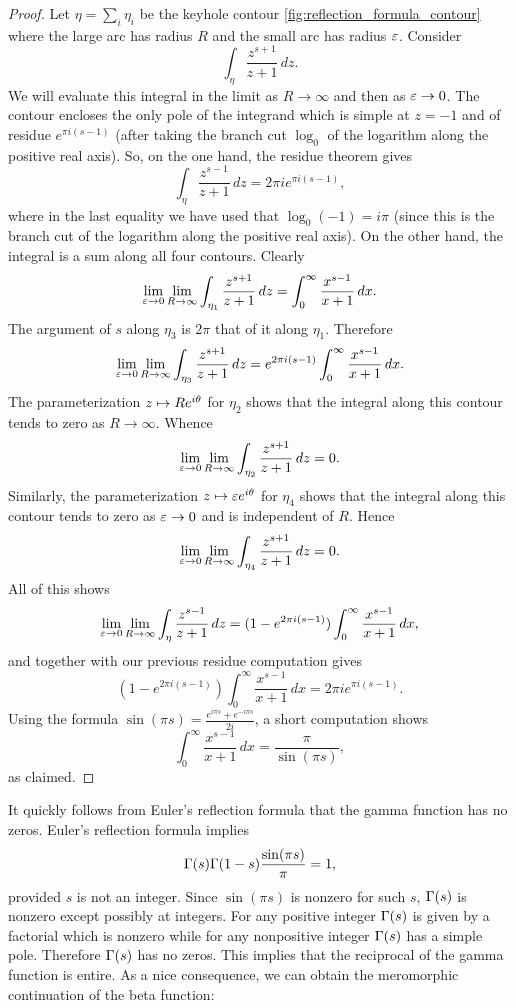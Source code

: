 \documentclass[12pt]{article}
\begin{document}
\begin{proof}
      Let \(\eta = \sum_{i}\eta_{i}\) be the keyhole contour \cref{fig:reflection_formula_contour} where the large arc has radius \(R\) and the small arc has radius \(\varepsilon\). Consider
      \[
        \int_{\eta}\frac{z^{s+1}}{z+1}\,dz.
      \]
      We will evaluate this integral in the limit as \(R \to \infty\) and then as \(\varepsilon \to 0\). The contour encloses the only pole of the integrand which is simple at \(z = -1\) and of residue \(e^{\pi i(s-1)}\) (after taking the branch cut \(\log_{0}\) of the logarithm along the positive real axis). So, on the one hand, the residue theorem gives
      \[
        \int_{\eta}\frac{z^{s-1}}{z+1}\,dz = 2\pi ie^{\pi i(s-1)},
      \]
      where in the last equality we have used that \(\log_{0}(-1) = i\pi\) (since this is the branch cut of the logarithm along the positive real axis). On the other hand, the integral is a sum along all four contours. Clearly
      \[
        \lim_{\varepsilon \to 0}\lim_{R \to \infty}\int_{\eta_{1}}\frac{z^{s+1}}{z+1}\,dz = \int_{0}^{\infty}\frac{x^{s-1}}{x+1}\,dx.
      \]
      The argument of \(s\) along \(\eta_{3}\) is \(2\pi\) that of it along \(\eta_{1}\). Therefore
      \[
        \lim_{\varepsilon \to 0}\lim_{R \to \infty}\int_{\eta_{3}}\frac{z^{s+1}}{z+1}\,dz = e^{2\pi i(s-1)}\int_{0}^{\infty}\frac{x^{s-1}}{x+1}\,dx.
      \]
      The parameterization \(z \mapsto Re^{i\theta}\) for \(\eta_{2}\) shows that the integral along this contour tends to zero as \(R \to \infty\). Whence
      \[
        \lim_{\varepsilon \to 0}\lim_{R \to \infty}\int_{\eta_{2}}\frac{z^{s+1}}{z+1}\,dz = 0.
      \]
      Similarly, the parameterization \(z \mapsto \varepsilon e^{i\theta}\) for \(\eta_{4}\) shows that the integral along this contour tends to zero as \(\varepsilon \to 0\) and is independent of \(R\). Hence 
      \[
        \lim_{\varepsilon \to 0}\lim_{R \to \infty}\int_{\eta_{4}}\frac{z^{s+1}}{z+1}\,dz = 0.
      \]
      All of this shows
      \[
        \lim_{\varepsilon \to 0}\lim_{R \to \infty} \int_{\eta}\frac{z^{s-1}}{z+1}\,dz = (1-e^{2\pi i(s-1)})\int_{0}^{\infty}\frac{x^{s-1}}{x+1}\,dx,
      \]
      and together with our previous residue computation gives
      \[
       (1-e^{2\pi i(s-1)})\int_{0}^{\infty}\frac{x^{s-1}}{x+1}\,dx = 2\pi ie^{\pi i(s-1)}.
      \]
      Using the formula \(\sin(\pi s) = \frac{e^{i\pi s}+e^{-i\pi s}}{2i}\), a short computation shows
      \[
        \int_{0}^{\infty}\frac{x^{s-1}}{x+1}\,dx = \frac{\pi}{\sin(\pi s)},
      \]
      as claimed.
    \end{proof}

    It quickly follows from Euler's reflection formula that the gamma function has no zeros. Euler's reflection formula implies
    \[
      \Gamma(s)\Gamma(1-s)\frac{\sin(\pi s)}{\pi} = 1,
    \]
    provided \(s\) is not an integer. Since \(\sin(\pi s)\) is nonzero for such \(s\), \(\Gamma(s)\) is nonzero except possibly at integers. For any positive integer \(\Gamma(s)\) is given by a factorial which is nonzero while for any nonpositive integer \(\Gamma(s)\) has a simple pole. Therefore \(\Gamma(s)\) has no zeros. This implies that the reciprocal of the gamma function is entire. As a nice consequence, we can obtain the meromorphic continuation of the beta function:
\end{document}
